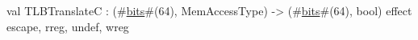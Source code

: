 val TLBTranslateC : (#\hyperref[zbits]{bits}#(64), MemAccessType) -> (#\hyperref[zbits]{bits}#(64), bool) effect {escape, rreg, undef, wreg}
